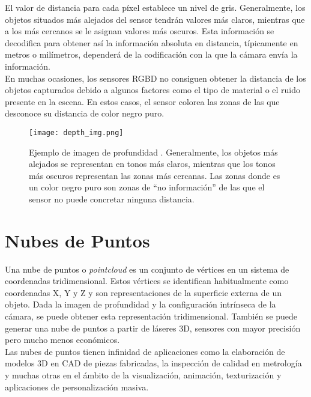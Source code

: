 El valor de distancia para cada píxel establece un nivel de gris. Generalmente, los objetos situados más alejados del sensor tendrán valores más claros, mientras que a los más cercanos se le asignan valores más oscuros. Esta información se decodifica para obtener así la información absoluta en distancia, típicamente en metros o milímetros, dependerá de la codificación con la que la cámara envía la información.\\

En muchas ocasiones, los sensores RGBD no consiguen obtener la distancia de los objetos capturados debido a algunos factores como el tipo de material o el ruido presente en la escena. En estos casos, el sensor colorea las zonas de las que desconoce su distancia de color negro puro.\\

\begin{figure}[H]
	\begin{center} 
		\texttt{[image: depth\_img.png]}
	\end{center}
	\caption{Ejemplo de imagen de profundidad \cite{depthimage}. Generalmente, los objetos más alejados se representan en tonos más claros, mientras que los tonos más oscuros representan las zonas más cercanas. Las zonas donde es un color negro puro son zonas de ``no información'' de las que el sensor no puede concretar ninguna distancia.}
	\label{fig:depth}
\end{figure}

\section{Nubes de Puntos}

Una nube de puntos o \textit{pointcloud} es un conjunto de vértices en un sistema de coordenadas tridimensional. Estos vértices se identifican habitualmente como coordenadas X, Y y Z y son representaciones de la superficie externa de un objeto. Dada la imagen de profundidad y la configuración intrínseca de la cámara, se puede obtener esta representación tridimensional. También se puede generar una nube de puntos a partir de láseres 3D, sensores con mayor precisión pero mucho menos económicos.\\

Las nubes de puntos tienen infinidad de aplicaciones como la elaboración de modelos 3D en CAD de piezas fabricadas, la inspección de calidad en metrología y muchas otras en el ámbito de la visualización, animación, texturización y aplicaciones de personalización masiva.\\


